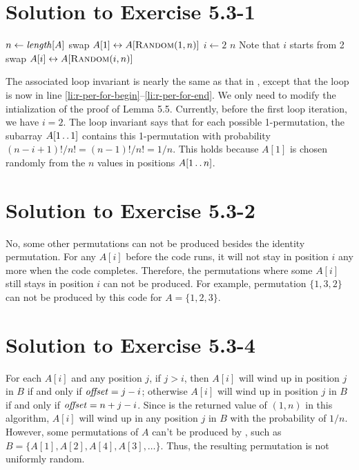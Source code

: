 \documentclass[a4paper, fleqn]{article}
\begin{document}
\section*{Solution to Exercise 5.3-1}

\begin{codebox}
\li  $n \gets \id{length}[A]$
\li  swap $A[1] \leftrightarrow A[\textnormal{\scshape Random}(1,n)]$
\li  \For $i \gets 2$ \To $n$    \Comment Note that $i$ starts from 2
                                                \label{li:r-per-for-begin}
\li      \Do
             swap $A[i] \leftrightarrow A[\textnormal{\scshape Random}(i,n)]$
                                                \label{li:r-per-for-end}
     \End
\end{codebox}

The associated loop invariant is nearly the same as that in ,
except that the  loop is now in line
\ref{li:r-per-for-begin}--\ref{li:r-per-for-end}. We only need to modify the
intialization of the proof of Lemma 5.5. Currently, before the first loop iteration,
we have $i = 2$. The loop invariant says that for each possible 1-permutation, the
subarray $A[1 \mathinner{\ldotp\ldotp} 1]$ contains this 1-permutation with probability
$(n - i + 1)! / n! = (n - 1)! / n! = 1/n$. This holds because $A[1]$ is chosen
randomly from the $n$ values in positions $A[1 \mathinner{\ldotp\ldotp} n]$.






\section*{Solution to Exercise 5.3-2}

No, some other permutations can not be produced besides the identity permutation.
For any $A[i]$ before the code runs, it will not stay in position $i$ any more
when the code completes. Therefore, the permutations where some $A[i]$ still stays
in position $i$ can not be produced. For example, permutation $\{1, 3, 2\}$ can
not be produced by this code for $A = \{1, 2, 3\}$.






\section*{Solution to Exercise 5.3-4}

For each $A[i]$ and any position $j$, if $j > i$, then $A[i]$ will wind up in
position $j$ in $B$ if and only if $\id{offset} = j - i$; otherwise $A[i]$ will
wind up in position $j$ in $B$ if and only if $\id{offset} = n + j - i$. Since
 is the returned value of $(1,n)$ in this algorithm,
$A[i]$ will wind up in any position $j$ in $B$ with the probability of $1/n$.
However, some permutations of $A$ can't be produced by ,
such as $B = \{A[1], A[2], A[4], A[3], \ldots\}$. Thus, the resulting permutation
is not uniformly random.
\end{document}
